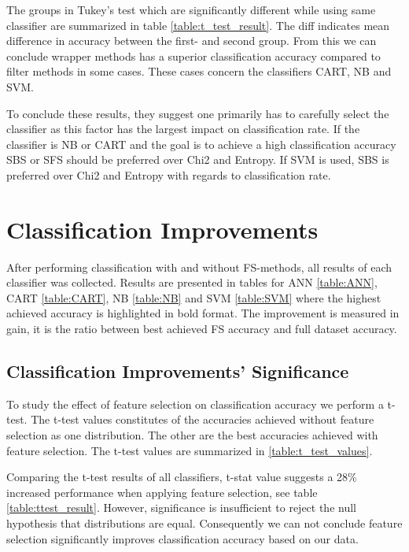 The groups in Tukey's test which are significantly different while using same classifier are summarized in table \ref{table:t_test_result}. The diff indicates mean difference in accuracy between the first- and second group. From this we can conclude wrapper methods has a superior classification accuracy compared to filter methods in some cases. These cases concern the classifiers CART, NB and SVM.



To conclude these results, they suggest one primarily has to carefully select the classifier as this factor has the largest impact on classification rate. If the classifier is NB or CART and the goal is to achieve a high classification accuracy SBS or SFS should be preferred over Chi2 and Entropy. If SVM is used, SBS is preferred over Chi2 and Entropy with regards to classification rate.

\FloatBarrier
\section{Classification Improvements}

After performing classification with and without FS-methods, all results of each classifier was collected. Results are presented in tables for ANN \ref{table:ANN}, CART \ref{table:CART}, NB \ref{table:NB} and SVM \ref{table:SVM} where the highest achieved accuracy is highlighted in bold format. The improvement is measured in gain, it is the ratio between best achieved FS accuracy and full dataset accuracy.



\FloatBarrier
\subsection{Classification Improvements' Significance}
\label{sec:Investigation_improvement}

To study the effect of feature selection on classification accuracy we perform a t-test. The t-test values constitutes of the accuracies achieved without feature selection as one distribution. The other are the best accuracies achieved with feature selection. The t-test values are summarized in \ref{table:t_test_values}.



Comparing the t-test results of all classifiers, t-stat value suggests a 28\% increased performance when applying feature selection, see table \ref{table:ttest_result}. However, significance is insufficient to reject the null hypothesis that distributions are equal. Consequently we can not conclude feature selection significantly improves classification accuracy based on our data.

